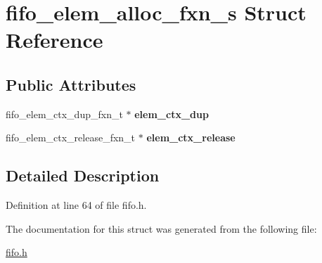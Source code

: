 \hypertarget{structfifo__elem__alloc__fxn__s}{}\section{fifo\+\_\+elem\+\_\+alloc\+\_\+fxn\+\_\+s Struct Reference}
\label{structfifo__elem__alloc__fxn__s}
\subsection*{Public Attributes}
\begin{DoxyCompactItemize}
\item 
fifo\+\_\+elem\+\_\+ctx\+\_\+dup\+\_\+fxn\+\_\+t $\ast$ {\bfseries elem\+\_\+ctx\+\_\+dup}\hypertarget{structfifo__elem__alloc__fxn__s_a914a09124b307aa94af6570833a6d99f}{}\label{structfifo__elem__alloc__fxn__s_a914a09124b307aa94af6570833a6d99f}

\item 
fifo\+\_\+elem\+\_\+ctx\+\_\+release\+\_\+fxn\+\_\+t $\ast$ {\bfseries elem\+\_\+ctx\+\_\+release}\hypertarget{structfifo__elem__alloc__fxn__s_a8e6d7024d5cc660668361013909aed2c}{}\label{structfifo__elem__alloc__fxn__s_a8e6d7024d5cc660668361013909aed2c}

\end{DoxyCompactItemize}


\subsection{Detailed Description}


Definition at line 64 of file fifo.\+h.



The documentation for this struct was generated from the following file\+:\begin{DoxyCompactItemize}
\item 
\hyperlink{fifo_8h}{fifo.\+h}\end{DoxyCompactItemize}
